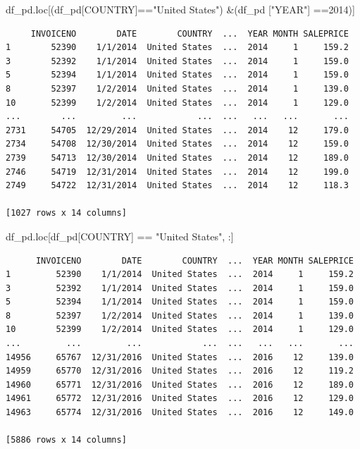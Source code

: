 \documentclass[
  letterpaper,
  DIV=11,
  numbers=noendperiod]{scrreprt}
\newenvironment{Shaded}{\begin{snugshade}}{\end{snugshade}}
\newcommand{\DecValTok}[1]{\textcolor[rgb]{0.68,0.00,0.00}{#1}}
\newcommand{\NormalTok}[1]{\textcolor[rgb]{0.00,0.23,0.31}{#1}}
\newcommand{\OperatorTok}[1]{\textcolor[rgb]{0.37,0.37,0.37}{#1}}
\newcommand{\StringTok}[1]{\textcolor[rgb]{0.13,0.47,0.30}{#1}}
\begin{document}
\begin{Shaded}
\begin{Highlighting}[]
\NormalTok{df\_pd.loc[(df\_pd[}\StringTok{\textquotesingle{}COUNTRY\textquotesingle{}}\NormalTok{]}\OperatorTok{==}\StringTok{"United States"}\NormalTok{) }\OperatorTok{\&}\NormalTok{(df\_pd [}\StringTok{"YEAR"}\NormalTok{] }\OperatorTok{==}\DecValTok{2014}\NormalTok{)]}
\end{Highlighting}
\end{Shaded}

\begin{verbatim}
     INVOICENO        DATE        COUNTRY  ...  YEAR MONTH SALEPRICE
1        52390    1/1/2014  United States  ...  2014     1     159.2
3        52392    1/1/2014  United States  ...  2014     1     159.0
5        52394    1/1/2014  United States  ...  2014     1     159.0
8        52397    1/2/2014  United States  ...  2014     1     139.0
10       52399    1/2/2014  United States  ...  2014     1     129.0
...        ...         ...            ...  ...   ...   ...       ...
2731     54705  12/29/2014  United States  ...  2014    12     179.0
2734     54708  12/30/2014  United States  ...  2014    12     159.0
2739     54713  12/30/2014  United States  ...  2014    12     189.0
2746     54719  12/31/2014  United States  ...  2014    12     199.0
2749     54722  12/31/2014  United States  ...  2014    12     118.3

[1027 rows x 14 columns]
\end{verbatim}

\begin{Shaded}
\begin{Highlighting}[]
\NormalTok{df\_pd.loc[df\_pd[}\StringTok{\textquotesingle{}COUNTRY\textquotesingle{}}\NormalTok{] }\OperatorTok{==} \StringTok{"United States"}\NormalTok{, :]}
\end{Highlighting}
\end{Shaded}

\begin{verbatim}
      INVOICENO        DATE        COUNTRY  ...  YEAR MONTH SALEPRICE
1         52390    1/1/2014  United States  ...  2014     1     159.2
3         52392    1/1/2014  United States  ...  2014     1     159.0
5         52394    1/1/2014  United States  ...  2014     1     159.0
8         52397    1/2/2014  United States  ...  2014     1     139.0
10        52399    1/2/2014  United States  ...  2014     1     129.0
...         ...         ...            ...  ...   ...   ...       ...
14956     65767  12/31/2016  United States  ...  2016    12     139.0
14959     65770  12/31/2016  United States  ...  2016    12     119.2
14960     65771  12/31/2016  United States  ...  2016    12     189.0
14961     65772  12/31/2016  United States  ...  2016    12     129.0
14963     65774  12/31/2016  United States  ...  2016    12     149.0

[5886 rows x 14 columns]
\end{verbatim}
\end{document}
